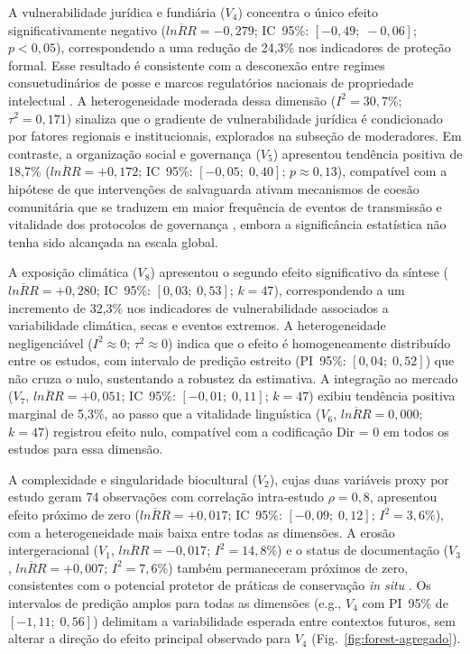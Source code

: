 \documentclass[12pt,a4paper]{article}
\begin{document}
A vulnerabilidade jurídica e fundiária ($V_4$) concentra o único efeito significativamente negativo ($\overline{lnRR} = -0{,}279$; IC~95\%: $[-0{,}49;\; -0{,}06]$; $p < 0{,}05$), correspondendo a uma redução de 24,3\% nos indicadores de proteção formal. Esse resultado é consistente com a desconexão entre regimes consuetudinários de posse e marcos regulatórios nacionais de propriedade intelectual \citep{Santilli2009,Dutfield2004,Cottier2004}. A heterogeneidade moderada dessa dimensão ($I^2 = 30{,}7\%$; $\tau^2 = 0{,}171$) sinaliza que o gradiente de vulnerabilidade jurídica é condicionado por fatores regionais e institucionais, explorados na subseção de moderadores. Em contraste, a organização social e governança ($V_5$) apresentou tendência positiva de 18,7\% ($\overline{lnRR} = +0{,}172$; IC~95\%: $[-0{,}05;\; 0{,}40]$; $p \approx 0{,}13$), compatível com a hipótese de que intervenções de salvaguarda ativam mecanismos de coesão comunitária que se traduzem em maior frequência de eventos de transmissão e vitalidade dos protocolos de governança \citep{Ostrom1990,Pretty2003,Berkes2007,Rathwell2015}, embora a significância estatística não tenha sido alcançada na escala global.

A exposição climática ($V_8$) apresentou o segundo efeito significativo da síntese ($\overline{lnRR} = +0{,}280$; IC~95\%: $[0{,}03;\; 0{,}53]$; $k = 47$), correspondendo a um incremento de 32,3\% nos indicadores de vulnerabilidade associados a variabilidade climática, secas e eventos extremos. A heterogeneidade negligenciável ($I^2 \approx 0$; $\tau^2 \approx 0$) indica que o efeito é homogeneamente distribuído entre os estudos, com intervalo de predição estreito (PI~95\%: $[0{,}04;\; 0{,}52]$) que não cruza o nulo, sustentando a robustez da estimativa. A integração ao mercado ($V_7$, $\overline{lnRR} = +0{,}051$; IC~95\%: $[-0{,}01;\; 0{,}11]$; $k = 47$) exibiu tendência positiva marginal de 5,3\%, ao passo que a vitalidade linguística ($V_6$, $\overline{lnRR} = 0{,}000$; $k = 47$) registrou efeito nulo, compatível com a codificação Dir = 0 em todos os estudos para essa dimensão.

A complexidade e singularidade biocultural ($V_2$), cujas duas variáveis proxy por estudo geram 74 observações com correlação intra-estudo $\rho = 0{,}8$, apresentou efeito próximo de zero ($\overline{lnRR} = +0{,}017$; IC~95\%: $[-0{,}09;\; 0{,}12]$; $I^2 = 3{,}6\%$), com a heterogeneidade mais baixa entre todas as dimensões. A erosão intergeracional ($V_1$, $\overline{lnRR} = -0{,}017$; $I^2 = 14{,}8\%$) e o status de documentação ($V_3$, $\overline{lnRR} = +0{,}007$; $I^2 = 7{,}6\%$) também permaneceram próximos de zero, consistentes com o potencial protetor de práticas de conservação \textit{in situ} \citep{Jarvis2008,Brush2004}. Os intervalos de predição amplos para todas as dimensões (e.g., $V_4$ com PI~95\% de $[-1{,}11;\; 0{,}56]$) delimitam a variabilidade esperada entre contextos futuros, sem alterar a direção do efeito principal observado para $V_4$ (Fig.~\ref{fig:forest-agregado}).
\end{document}

